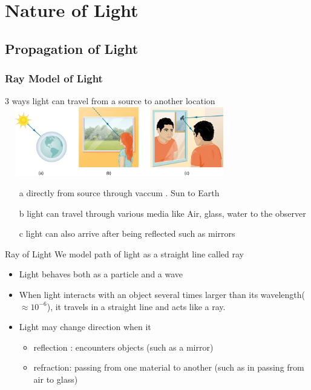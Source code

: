 \documentclass{beamer}
\title{}
\author{Nithin}
\institute{}
\date{\today}
\begin{document}
\section{Nature of Light}
	\subsection{Propagation of Light}
\begin{frame}
	
 \frametitle{Ray Model of Light}
 3 ways light can travel from a source to another location
 	\includegraphics[width=10cm,height=3cm]{1.png}
 \begin{enumerate}
 	\item[a] directly from source through vaccum . Sun to Earth
 	\item[b] light can travel through various media like Air, glass, water to the observer 
 	\item[c] light can also arrive after being reflected such as mirrors
 \end{enumerate}

\end{frame}
\begin{frame}
\begin{block}{Ray of Light}
	We model path of light as a straight line called \alert{ray}
\end{block}
\begin{itemize}
	\item Light behaves both as a particle and a wave
	\item When light interacts with an object several times larger than its wavelength($\approx 10^{-6}$), it travels in a straight line and acts like a ray.
	\item Light may change direction when it 
	\begin{itemize}
		\item reflection : encounters objects (such as a mirror) 
		\item refraction: passing from one material to another (such as in passing from air to glass) 
	\end{itemize}	
\end{itemize}
\end{frame}
\end{document}
